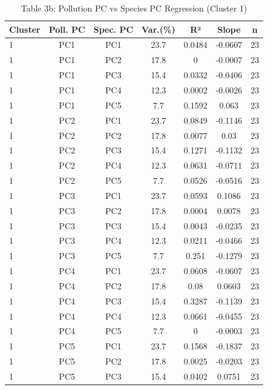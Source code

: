 \begin{table}[htbp]
    \centering
    \small
    \caption{Table 3b: Pollution PC vs Species PC Regression (Cluster 1)}
    \label{tab:table3b_pollution_pc_species_pc_regression}
    \begin{tabular}{lcccccc}
        \toprule
        Cluster & Poll. PC & Spec. PC & Var.(\%) & R² & Slope & n \\
        \midrule
        1 & PC1 & PC1 & 23.7 & 0.0484 & -0.0607 & 23 \\
        1 & PC1 & PC2 & 17.8 & 0 & -0.0007 & 23 \\
        1 & PC1 & PC3 & 15.4 & 0.0332 & -0.0406 & 23 \\
        1 & PC1 & PC4 & 12.3 & 0.0002 & -0.0026 & 23 \\
        1 & PC1 & PC5 & 7.7 & 0.1592 & 0.063 & 23 \\
        1 & PC2 & PC1 & 23.7 & 0.0849 & -0.1146 & 23 \\
        1 & PC2 & PC2 & 17.8 & 0.0077 & 0.03 & 23 \\
        1 & PC2 & PC3 & 15.4 & 0.1271 & -0.1132 & 23 \\
        1 & PC2 & PC4 & 12.3 & 0.0631 & -0.0711 & 23 \\
        1 & PC2 & PC5 & 7.7 & 0.0526 & -0.0516 & 23 \\
        1 & PC3 & PC1 & 23.7 & 0.0593 & 0.1086 & 23 \\
        1 & PC3 & PC2 & 17.8 & 0.0004 & 0.0078 & 23 \\
        1 & PC3 & PC3 & 15.4 & 0.0043 & -0.0235 & 23 \\
        1 & PC3 & PC4 & 12.3 & 0.0211 & -0.0466 & 23 \\
        1 & PC3 & PC5 & 7.7 & 0.251 & -0.1279 & 23 \\
        1 & PC4 & PC1 & 23.7 & 0.0608 & -0.0607 & 23 \\
        1 & PC4 & PC2 & 17.8 & 0.08 & 0.0603 & 23 \\
        1 & PC4 & PC3 & 15.4 & 0.3287 & -0.1139 & 23 \\
        1 & PC4 & PC4 & 12.3 & 0.0661 & -0.0455 & 23 \\
        1 & PC4 & PC5 & 7.7 & 0 & -0.0003 & 23 \\
        1 & PC5 & PC1 & 23.7 & 0.1568 & -0.1837 & 23 \\
        1 & PC5 & PC2 & 17.8 & 0.0025 & -0.0203 & 23 \\
        1 & PC5 & PC3 & 15.4 & 0.0402 & 0.0751 & 23 \\

\end{tabular}
\end{table}
